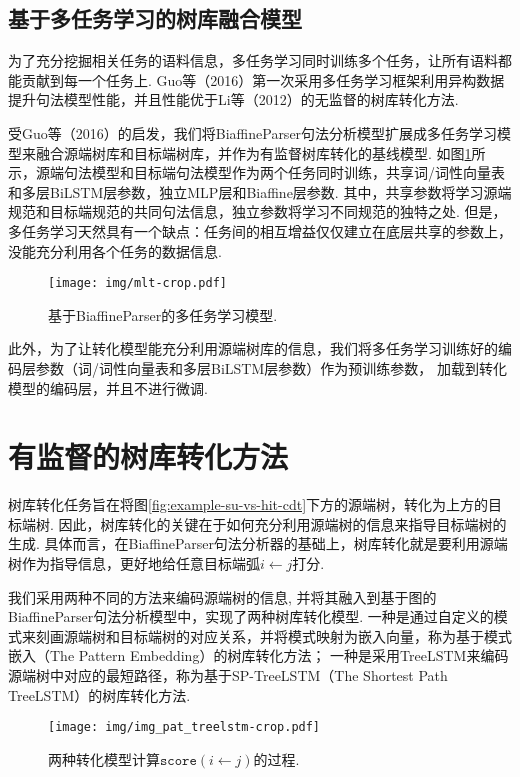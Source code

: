\subsection{基于多任务学习的树库融合模型}
为了充分挖掘相关任务的语料信息，多任务学习同时训练多个任务，让所有语料都能贡献到每一个任务上.
Guo等（2016）第一次采用多任务学习框架利用异构数据提升句法模型性能，并且性能优于Li等（2012）的无监督的树库转化方法.

受Guo等（2016）的启发，我们将BiaffineParser句法分析模型扩展成多任务学习模型来融合源端树库和目标端树库，并作为有监督树库转化的基线模型.
如图\ref{fig:mlt}所示，源端句法模型和目标端句法模型作为两个任务同时训练，共享词/词性向量表和多层BiLSTM层参数，独立MLP层和Biaffine层参数.
其中，共享参数将学习源端规范和目标端规范的共同句法信息，独立参数将学习不同规范的独特之处.
但是，多任务学习天然具有一个缺点：任务间的相互增益仅仅建立在底层共享的参数上，没能充分利用各个任务的数据信息.

\begin{figure}[hb!]
    \centering
    \texttt{[image: img/mlt-crop.pdf]}
    \caption{基于BiaffineParser的多任务学习模型. }
    \label{fig:mlt}
\end{figure}
此外，为了让转化模型能充分利用源端树库的信息，我们将多任务学习训练好的编码层参数（词/词性向量表和多层BiLSTM层参数）作为预训练参数，
加载到转化模型的编码层，并且不进行微调.

\section{有监督的树库转化方法}
树库转化任务旨在将图\ref{fig:example-su-vs-hit-cdt}下方的源端树，转化为上方的目标端树.
因此，树库转化的关键在于如何充分利用源端树的信息来指导目标端树的生成.
具体而言，在BiaffineParser句法分析器的基础上，树库转化就是要利用源端树作为指导信息，更好地给任意目标端弧$i \leftarrow j$打分.

我们采用两种不同的方法来编码源端树的信息, 并将其融入到基于图的BiaffineParser句法分析模型中，实现了两种树库转化模型.
一种是通过自定义的模式来刻画源端树和目标端树的对应关系，并将模式映射为嵌入向量，称为基于模式嵌入（The Pattern Embedding）的树库转化方法；
一种是采用TreeLSTM来编码源端树中对应的最短路径，称为基于SP-TreeLSTM（The Shortest Path TreeLSTM）的树库转化方法.
\begin{figure}[tb!]

    \centering
    \texttt{[image: img/img\_pat\_treelstm-crop.pdf]}
    \caption{两种转化模型计算$\texttt{score}(i \leftarrow j)$的过程. }
    \label{fig:conversion_models}
\end{figure}

